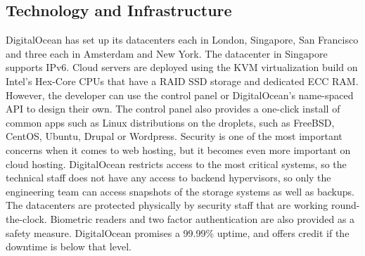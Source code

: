 \documentclass[../thesis.tex]{subfiles}
\begin{document}
\subsection*{Technology and Infrastructure}
DigitalOcean has set up its datacenters each in London, Singapore, San Francisco and three each in Amsterdam and New York. The datacenter in Singapore supports IPv6. Cloud servers are deployed using the KVM virtualization build on Intel's Hex-Core CPUs that have a RAID SSD storage and dedicated ECC RAM. However, the developer can use the control panel or DigitalOcean's name-spaced API to design their own. The control panel also provides a one-click install of common apps such as Linux distributions on the droplets, such as FreeBSD, CentOS, Ubuntu, Drupal or Wordpress.
Security is one of the most important concerns when it comes to web hosting, but it becomes even more important on cloud hosting. DigitalOcean restricts access to the most critical systems, so the technical staff does not have any access to backend hypervisors, so only the engineering team can access snapshots of the storage systems as well as backups. The datacenters are protected physically by security staff that are working round-the-clock. Biometric readers and two factor authentication are also provided as a safety measure. DigitalOcean promises a 99.99\% uptime, and offers credit if the downtime is below that level.
\end{document}
